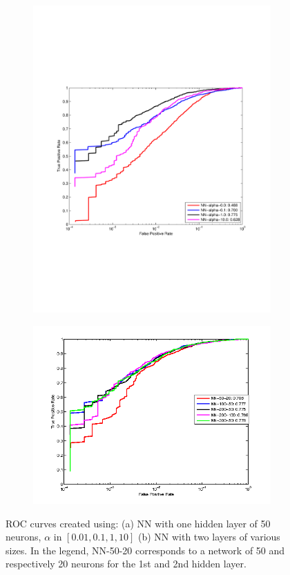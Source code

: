 \begin{figure}[h]
  \centering
  \begin{subfigure}[b]{0.49\textwidth}
   \includegraphics[width=\textwidth]{figures/NN-alpha.pdf}
    \caption{}
    \label{fig:NNa}
  \end{subfigure}
  \begin{subfigure}[b]{0.49\textwidth}
    \includegraphics[width=\textwidth]{figures/NN-2layers.png}
    \caption{}
    \label{fig:NNb}
  \end{subfigure}
  \caption{ROC curves created using: (a) NN with one hidden layer of 50 neurons, $\alpha$ in $[0.01,0.1,1,10]$ (b) NN with two layers of various sizes. In the legend, NN-50-20 corresponds to a network of 50 and respectively 20  neurons for the 1st and 2nd hidden layer.}
\end{figure}

